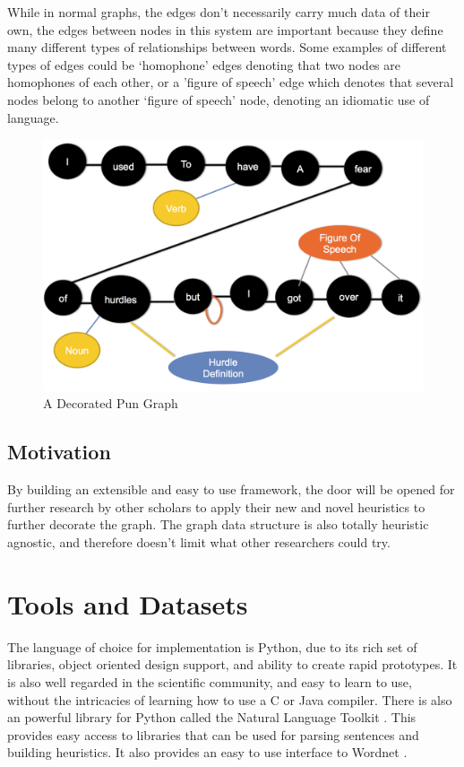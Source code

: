 While in normal graphs, the edges don't necessarily carry much data of their own, the edges between nodes in this system are important because they define many different types of relationships between words. Some examples of different types of edges could be `homophone' edges denoting that two nodes are homophones of each other, or a 'figure of speech' edge which denotes that several nodes belong to another `figure of speech' node, denoting an idiomatic use of language.

\begin{center}
\begin{figure}[]
  \includegraphics[keepaspectratio=true, scale=.25]{pun-graph-example.png}
  \caption{A Decorated Pun Graph}
\end{figure}
\end{center}

\subsection{Motivation}

By building an extensible and easy to use framework, the door will be opened for further research by other scholars to apply their new and novel heuristics to further decorate the graph. The graph data structure is also totally heuristic agnostic, and therefore doesn't limit what other researchers could try.

\section{Tools and Datasets}

The language of choice for implementation is Python, due to its rich set of libraries, object oriented design support, and ability to create rapid prototypes. It is also well regarded in the scientific community, and easy to learn to use, without the intricacies of learning how to use a C or Java compiler. There is also an powerful library for Python called the Natural Language Toolkit \cite{NLTK}. This provides easy access to libraries that can be used for parsing sentences and building heuristics. It also provides an easy to use interface to Wordnet \cite{wordnet}.

